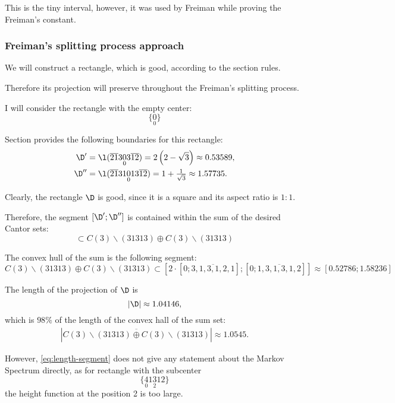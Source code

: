 This is the tiny interval, however, it was used by Freiman
while proving the Freiman's constant.


\subsubsection{Freiman's splitting process approach}

We will construct a rectangle,
which is good, according to the section  rules.

Therefore its projection will preserve throughout the Freiman's splitting process.

I will consider the rectangle with the empty center:
\begin{equation*}
	\{\underset{0}{0}\}
\end{equation*}

Section  provides the following boundaries for this rectangle:
\begin{align*}
	\D' & = \l(\overline{21}3\underset{0}{0}3\overline{12}) = 2\left(2 - \sqrt{3}\right) \approx 0.53589,\\
	\D'' & = \l(\overline{21}31\underset{0}{0}13\overline{12}) = 1 + \tfrac{1}{\sqrt{3}} \approx 1.57735.
\end{align*}

Clearly, the rectangle $\D$ is good, since it is a square and its aspect ratio is $1:1$.

Therefore, the segment $[\D'; \D'']$ is contained within the sum of the desired Cantor sets:
\begin{equation}
	[\D'; \D''] \subset C(3) \backslash (31313) \oplus C(3) \backslash (31313)
\end{equation}

The convex hull of the sum is the following segment:
\begin{equation*}
	C(3) \backslash (31313) \oplus C(3) \backslash (31313) \subset
	\left[ 2 \cdot \left[0; \overline{3, 1, 3, 1, 2, 1}\right]; \left[0; \overline{1, 3, 1, 3, 1, 2}\right] \right] \approx
	\left[0.52786; 1.58236\right]
\end{equation*}

The length of the projection of $\D$ is
\begin{equation}
	\label{eq:length-segment}
	\left|\D\right| \approx 1.04146,
\end{equation}
which is $98\%$ of the length of the convex hall of the sum set:
\begin{gather*}
	\left|\overline{C(3) \backslash (31313) \oplus C(3) \backslash (31313)}\right| \approx 1.0545.
\end{gather*} 

However, \ref{eq:length-segment} does not give any statement about the Markov Spectrum directly,
as for rectangle with the subcenter
\begin{equation*}
	\{\underset{0}{4}1\underset{2}{3}12\}
\end{equation*}
the height function at the position 2 is too large.

